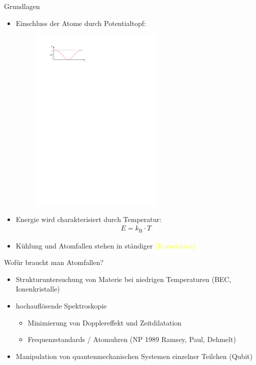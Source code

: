 \documentclass[12pt,xcolor=dvipsnames]{beamer}
\newcommand{\korr}[1]{{\textcolor{Yellow}{(#1)}}}
\begin{document}
\begin{frame}{Grundlagen}
	\begin{itemize}
		\item Einschluss der Atome durch Potentialtopf:
			\begin{figure}
				\centering
				\includegraphics[width=0.6\textwidth]{./figures/fallentiefe.pdf}
			\end{figure}
		\item Energie wird charakterisiert durch Temperatur:
		\begin{align*}
		E = k_\mathrm{B} \cdot T
		\end{align*}
		
		\item Kühlung und Atomfallen stehen in ständiger \korr{Korrelation}
		
	\end{itemize}

\end{frame}

\begin{frame}{Wofür braucht man Atomfallen?}
	\begin{itemize}
		\item Strukturuntersuchung von Materie bei niedrigen Temperaturen (BEC, Ionenkristalle)
		
		\item hochauflösende Spektroskopie
			\begin{itemize}
				\item Minimierung von Dopplereffekt und Zeitdilatation
				\item Frequenzstandards / Atomuhren (NP 1989 Ramsey, Paul, Dehmelt)
			\end{itemize}
		
		\item Manipulation von quantenmechanischen Systemen einzelner Teilchen (Qubit)
	\end{itemize}
\end{frame}
\end{document}
